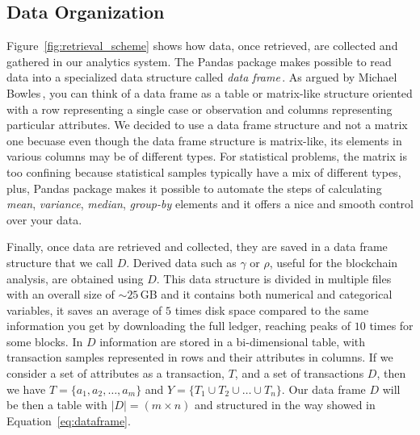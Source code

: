\documentclass[USenglish]{uit-thesis}
\begin{document}
\subsection{Data Organization}
\label{sec:dataorganization}
Figure~\ref{fig:retrieval_scheme} shows how data,
once retrieved, are collected and gathered
in our analytics system.
The Pandas package makes possible
to read data into a specialized data structure
called \emph{data frame}\,\cite{pandas}.
As argued by Michael Bowles\,\cite{bowles2015machine},
you can think of a data frame as a table or matrix-like
structure oriented with a row representing a single case
or observation and columns representing particular attributes.
We decided to use a data frame structure and not a
matrix one becuase even though the data frame structure
is matrix-like, its elements in various columns may be of
different types. For statistical problems, the matrix is too
confining because statistical samples typically have a mix
of different types, plus, Pandas package makes it possible
to automate the steps of calculating \emph{mean}, \emph{variance},
\emph{median}, \emph{group-by} elements and it
offers a nice and smooth control over your data. 

Finally, once data are
retrieved and collected, they are saved in a data frame
structure that we call $D$.
Derived data such as $\gamma$ or $\rho$,
useful for the blockchain analysis, are obtained using $D$.
This data structure is divided in multiple files
with an overall size of $\sim$$25$\,GB and it contains
both numerical and categorical variables, it saves an average
of $5$ times disk space compared to the same
information you get by downloading the full ledger,
reaching peaks of $10$ times for some blocks.
In $D$ information are stored in a bi-dimensional table,
with transaction samples represented in
rows and their attributes in columns.
If we consider a set of attributes as a transaction, $T$,
and a set of transactions $D$, then we have
$
T = \{ a_1, a_2, \dots, a_m \}
$
and
$
Y = \{ T_1 \cup T_2 \cup \dots \cup T_n \}.
$
Our data frame $D$ will be then a table with $|D| = (m \times n)$
and structured in the way showed in Equation~\ref{eq:dataframe}.
\end{document}
